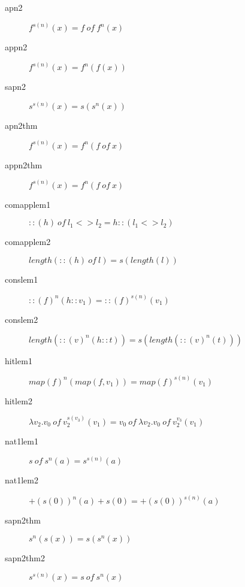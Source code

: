 

\begin{description}
\item[apn2]$f^{s(n)}(x)=f \: of \: f^n(x)$
\item[appn2]$f^{s(n)}(x)=f^n(f(x))$
\item[sapn2]$s^{s(n)}(x)=s(s^n(x))$
\item[apn2thm]$f^{s(n)}(x)=f^n(f \: of \: x)$
\item[appn2thm]$f^{s(n)}(x)=f^n(f \: of \: x)$
\item[comapplem1]$::(h) \: of \: l_1 <> l_2 = h::(l_1 <> l_2)$
\item[comapplem2]$length(::(h) \: of \: l)=s(length(l))$
\item[conslem1]$::(f)^n(h::v_1)=::(f)^{s(n)}(v_1)$
\item[conslem2]$length(::(v)^n(h::t))=s(length(::(v)^n(t)))$
\item[hitlem1]$map(f)^n(map(f, v_1))=map(f)^{s(n)}(v_1)$
\item[hitlem2]$\lambda v_2. v_0 \: of \: v_2^{s(v_3)}(v_1)= v_0 \: of
\: \lambda v_2. v_0 \: of \: v_2^{v_3}(v_1)$
\item[nat1lem1]$s \: of \: s^n(a)=s^{s(n)}(a)$
\item[nat1lem2]$+(s(0))^n(a)+s(0)=+(s(0))^{s(n)}(a)$
\item[sapn2thm]$s^n(s(x))=s(s^n(x))$
\item[sapn2thm2]$s^{s(n)}(x)=s \: of \: s^n(x)$
\end{description}


